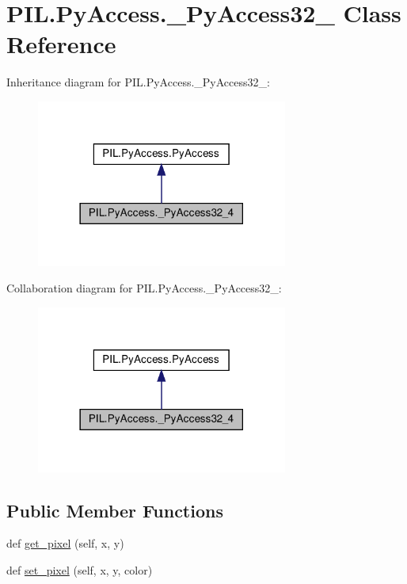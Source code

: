 \hypertarget{classPIL_1_1PyAccess_1_1__PyAccess32__4}{}\section{P\+I\+L.\+Py\+Access.\+\_\+\+Py\+Access32\+\_ Class Reference}
\label{classPIL_1_1PyAccess_1_1__PyAccess32__4}


Inheritance diagram for P\+I\+L.\+Py\+Access.\+\_\+\+Py\+Access32\+\_\+:
\nopagebreak
\begin{figure}[H]
\begin{center}
\leavevmode
\includegraphics[width=234pt]{classPIL_1_1PyAccess_1_1__PyAccess32__4__inherit__graph}
\end{center}
\end{figure}


Collaboration diagram for P\+I\+L.\+Py\+Access.\+\_\+\+Py\+Access32\+\_\+:
\nopagebreak
\begin{figure}[H]
\begin{center}
\leavevmode
\includegraphics[width=234pt]{classPIL_1_1PyAccess_1_1__PyAccess32__4__coll__graph}
\end{center}
\end{figure}
\subsection*{Public Member Functions}
\begin{DoxyCompactItemize}
\item 
def \hyperlink{classPIL_1_1PyAccess_1_1__PyAccess32__4_a4952c007a6296b7cdd140e484530d86c}{get\+\_\+pixel} (self, x, y)
\item 
def \hyperlink{classPIL_1_1PyAccess_1_1__PyAccess32__4_a6805374790445b521c3f98d6448454f5}{set\+\_\+pixel} (self, x, y, color)
\end{DoxyCompactItemize}
